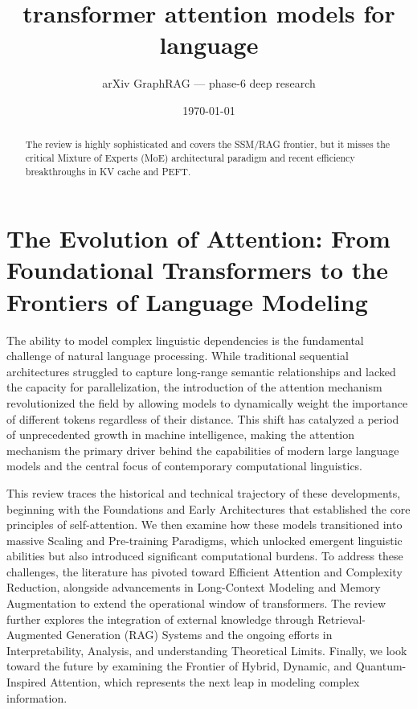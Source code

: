 \documentclass[11pt]{article}
\title{transformer attention models for language}
\author{arXiv GraphRAG --- phase-6 deep research}
\date{\today}
\begin{document}
\maketitle

\begin{abstract}
The review is highly sophisticated and covers the SSM/RAG frontier, but it misses the critical Mixture of Experts (MoE) architectural paradigm and recent efficiency breakthroughs in KV cache and PEFT.
\end{abstract}

\section{The Evolution of Attention: From Foundational Transformers to the Frontiers of Language Modeling}

The ability to model complex linguistic dependencies is the fundamental challenge of natural language processing. While traditional sequential architectures struggled to capture long-range semantic relationships and lacked the capacity for parallelization, the introduction of the attention mechanism revolutionized the field by allowing models to dynamically weight the importance of different tokens regardless of their distance. This shift has catalyzed a period of unprecedented growth in machine intelligence, making the attention mechanism the primary driver behind the capabilities of modern large language models and the central focus of contemporary computational linguistics.

This review traces the historical and technical trajectory of these developments, beginning with the Foundations and Early Architectures that established the core principles of self-attention. We then examine how these models transitioned into massive Scaling and Pre-training Paradigms, which unlocked emergent linguistic abilities but also introduced significant computational burdens. To address these challenges, the literature has pivoted toward Efficient Attention and Complexity Reduction, alongside advancements in Long-Context Modeling and Memory Augmentation to extend the operational window of transformers. The review further explores the integration of external knowledge through Retrieval-Augmented Generation (RAG) Systems and the ongoing efforts in Interpretability, Analysis, and understanding Theoretical Limits. Finally, we look toward the future by examining the Frontier of Hybrid, Dynamic, and Quantum-Inspired Attention, which represents the next leap in modeling complex information.
\end{document}
